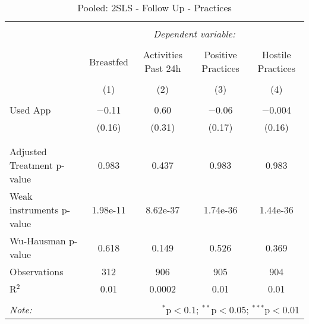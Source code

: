 
\begin{table}[!htbp] \centering 
  \caption{Pooled: 2SLS - Follow Up - Practices} 
  \label{tbl:Pooled: 2SLS - Follow Up - Practices} 
\begin{tabular}{@{\extracolsep{5pt}}lcccc} 
\\[-1.8ex]\hline 
\hline \\[-1.8ex] 
 & \multicolumn{4}{c}{\textit{Dependent variable:}} \\ 
\cline{2-5} 
\\[-1.8ex] & Breastfed & Activities Past 24h & Positive Practices & Hostile Practices \\ 
\\[-1.8ex] & (1) & (2) & (3) & (4)\\ 
\hline \\[-1.8ex] 
 Used App & $-$0.11 & 0.60 & $-$0.06 & $-$0.004 \\ 
  & (0.16) & (0.31) & (0.17) & (0.16) \\ 
  & & & & \\ 
\hline \\[-1.8ex] 
Adjusted Treatment p-value & 0.983 & 0.437 & 0.983 & 0.983 \\ 
Weak instruments p-value & 1.98e-11 & 8.62e-37 & 1.74e-36 & 1.44e-36 \\ 
Wu-Hausman p-value & 0.618 & 0.149 & 0.526 & 0.369 \\ 
Observations & 312 & 906 & 905 & 904 \\ 
R$^{2}$ & 0.01 & 0.0002 & 0.01 & 0.01 \\ 
\hline 
\hline \\[-1.8ex] 
\textit{Note:}  & \multicolumn{4}{r}{$^{*}$p$<$0.1; $^{**}$p$<$0.05; $^{***}$p$<$0.01} \\ 
\end{tabular} 
\end{table} 

